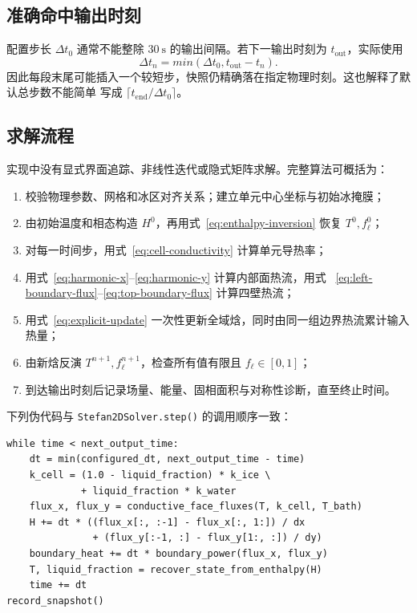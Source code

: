 \documentclass[UTF8,11pt]{ctexart}
\numberwithin{equation}{section}
\newcommand{\fl}{f_{\ell}}
\newcommand{\code}[1]{\texttt{#1}}
\begin{document}
\subsection{准确命中输出时刻}

配置步长 $\Delta t_0$ 通常不能整除 $\SI{30}{\second}$ 的输出间隔。若下一输出时刻为
$t_{\mathrm{out}}$，实际使用
\begin{equation}
      \Delta t_n=min(\Delta t_0,t_{\mathrm{out}}-t_n).
      \label{eq:short-step}
\end{equation}
因此每段末尾可能插入一个较短步，快照仍精确落在指定物理时刻。这也解释了默认总步数不能简单
写成 $\lceil t_{\mathrm{end}}/\Delta t_0\rceil$。

\subsection{求解流程}

实现中没有显式界面追踪、非线性迭代或隐式矩阵求解。完整算法可概括为：
\begin{enumerate}
      \item 校验物理参数、网格和冰区对齐关系；建立单元中心坐标与初始冰掩膜；
      \item 由初始温度和相态构造 $H^0$，再用式~\eqref{eq:enthalpy-inversion} 恢复
            $T^0,\fl^0$；
      \item 对每一时间步，用式~\eqref{eq:cell-conductivity} 计算单元导热率；
      \item 用式~\eqref{eq:harmonic-x}--\eqref{eq:harmonic-y} 计算内部面热流，用式
            ~\eqref{eq:left-boundary-flux}--\eqref{eq:top-boundary-flux} 计算四壁热流；
      \item 用式~\eqref{eq:explicit-update} 一次性更新全域焓，同时由同一组边界热流累计输入热量；
      \item 由新焓反演 $T^{n+1},\fl^{n+1}$，检查所有值有限且 $\fl\in[0,1]$；
      \item 到达输出时刻后记录场量、能量、固相面积与对称性诊断，直至终止时间。
\end{enumerate}

下列伪代码与 \code{Stefan2DSolver.step()} 的调用顺序一致：
\begin{lstlisting}[style=iceflowcode]
while time < next_output_time:
    dt = min(configured_dt, next_output_time - time)
    k_cell = (1.0 - liquid_fraction) * k_ice \
             + liquid_fraction * k_water
    flux_x, flux_y = conductive_face_fluxes(T, k_cell, T_bath)
    H += dt * ((flux_x[:, :-1] - flux_x[:, 1:]) / dx
               + (flux_y[:-1, :] - flux_y[1:, :]) / dy)
    boundary_heat += dt * boundary_power(flux_x, flux_y)
    T, liquid_fraction = recover_state_from_enthalpy(H)
    time += dt
record_snapshot()
\end{lstlisting}
\end{document}
